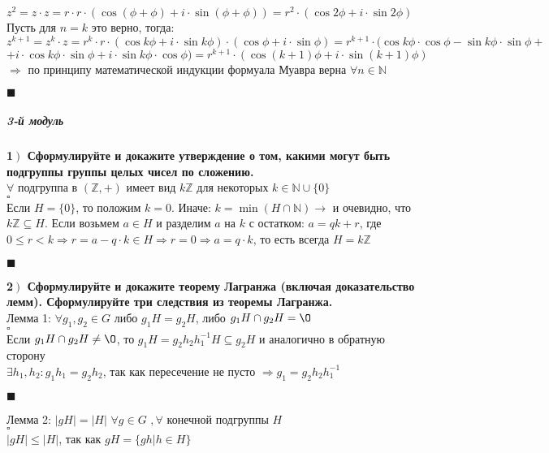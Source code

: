 \documentclass[a4paper,12pt]{article}
\begin{document}
$z^2=z\cdot z=r\cdot r\cdot(\cos(\phi+\phi)+i\cdot\sin(\phi+\phi))=r^2\cdot(\cos2\phi+i\cdot\sin2\phi)$\\
Пусть для $n=k$ это верно, тогда:\\
$z^{k+1}=z^k\cdot z=r^k\cdot r\cdot(\cos k\phi+i\cdot\sin k\phi)\cdot(\cos\phi+i\cdot\sin\phi)=r^{k+1}\cdot(\cos k\phi\cdot\cos\phi-\sin k\phi\cdot\sin\phi+$\\$+i\cdot\cos k\phi\cdot\sin\phi+i\cdot\sin k\phi\cdot\cos\phi)=r^{k+1}\cdot(\cos(k+1)\phi+i\cdot\sin(k+1)\phi)$\\
$\Rightarrow$ по принципу математической индукции формуала Муавра верна $\forall n\in\mathbb{N}$
\begin{flushright}
	$\blacksquare$
\end{flushright}\newpage
\subparagraph{3-й модуль}
\textbf{1$\left.\right)$ Сформулируйте и докажите утверждение о том, какими могут быть подгруппы группы целых чисел по сложению.}\\$\forall$ подгруппа в $(\mathbb{Z}, +)$ имеет вид $k\mathbb{Z}$ для некоторых $k\in \mathbb{N}\cup\{0\}$\\
$\square$\\
Если $H=\{0\}$, то положим $k=0$. Иначе: $k=\min(H\cap\mathbb{N})\rightarrow$ и очевидно, что $k\mathbb{Z}\subseteq H$. Если возьмем $a\in H$ и разделим $a$ на $k$ с остатком: $a=qk+r$, где $0\leq r<k\Rightarrow r=a-q\cdot k\in H\Rightarrow r=0\Rightarrow a=q\cdot k$, то есть всегда $H=k\mathbb{Z}$
\begin{flushright}
	$\blacksquare$
\end{flushright}
\textbf{2$\left.\right)$ Сформулируйте и докажите теорему Лагранжа (включая доказательство лемм). Сформулируйте три следствия из теоремы Лагранжа.}\\Лемма 1: $\forall g_1, g_2\in G$ либо $g_1H=g_2H$, либо $g_1H\cap g_2H=\O$\\
$\square$\\
Если $g_1H\cap g_2H\ne\O$, то $g_1H=g_2h_2h^{-1}_1H\subseteq g_2H$ и аналогично в обратную сторону\\
$\exists h_1, h_2:g_1h_1=g_2h_2$, так как пересечение не пусто $\Rightarrow g_1=g_2h_2h^{-1}_1$
\begin{flushright}
	$\blacksquare$
\end{flushright}
Лемма 2: $|gH|=|H|$ $\forall g\in G$ $, \forall$ конечной подгруппы $H$\\
$\square$\\
$|gH|\leq|H|$, так как $gH=\{gh|h\in H \}$\\
\end{document}
